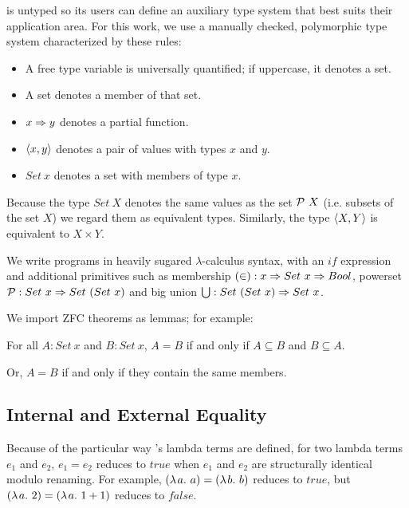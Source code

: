 \documentclass{llncs}
\begin{document}

\lzfclang is untyped so its users can define an auxiliary type system that best suits their application area.
For this work, we use a manually checked, polymorphic type system characterized by these rules:
\begin{itemize}
	\item A free type variable is universally quantified; if uppercase, it denotes a set.
	\item A set denotes a member of that set.
	\item $x \Rightarrow y$ denotes a partial function.
	\item $\langle{x,y}\rangle$ denotes a pair of values with types $x$ and $y$.
	\item $Set~x$ denotes a set with members of type $x$.
\end{itemize}
Because the type $Set~X$ denotes the same values as the set $\mathcal{P}~X$ (i.e. subsets of the set $X$) we regard them as equivalent types.
Similarly, the type $\langle{X,Y}\rangle$ is equivalent to $X \times Y$.

We write \lzfclang programs in heavily sugared $\lambda$-calculus syntax, with an $if$ expression and additional primitives such as membership $(\in) : x \Rightarrow Set~x \Rightarrow Bool$, powerset $\mathcal{P} : Set~x \Rightarrow Set~(Set~x)$ and big union $\textstyle\bigcup : Set~(Set~x) \Rightarrow Set~x$.

We import ZFC theorems as lemmas; for example:

\begin{lemma}[extensionality]
For all $A : Set~x$ and $B : Set~x$, $A = B$ if and only if $A \subseteq B$ and $B \subseteq A$.
\end{lemma}
Or, $A = B$ if and only if they contain the same members.


\subsection{Internal and External Equality}

Because of the particular way \lzfclang's lambda terms are defined, for two lambda terms $\mathit{e}_1$ and $\mathit{e}_2$, $\mathit{e}_1 = \mathit{e}_2$ reduces to $true$ when $\mathit{e}_1$ and $\mathit{e}_2$ are structurally identical modulo renaming.
For example, $(\lambda\mspace{2mu}{a}\ldotp\,{a}) = (\lambda\mspace{2mu}{b}\ldotp\,{b})$ reduces to $true$, but $(\lambda\mspace{2mu}{a}\ldotp\,{2}) = (\lambda\mspace{2mu}{a}\ldotp\,{1+1})$ reduces to $false$.
\end{document}

